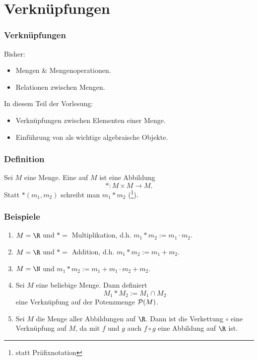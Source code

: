 \section{Verknüpfungen}
%
\begin{frame}\frametitle{Verknüpfungen}
	
	Bisher:
	\begin{itemize}
		\item Mengen \& Mengenoperationen.
		\item Relationen zwischen Mengen.
	\end{itemize}
	
	\vfill
	In diesem Teil der Vorlesung:
	\begin{itemize}
		\item Verknüpfungen zwischen Elementen einer Menge.
		\item Einführung von  als wichtige algebraische Objekte.
	\end{itemize} 
	
\end{frame}
%
%
\begin{frame}\frametitle{Definition}

	Sei $M$ eine Menge. Eine  auf $M$ ist eine Abbildung
	$$
		\ast: M \times M \to M.
	$$
	Statt $\ast(m_1,m_2)$ schreibt man $m_1\ast m_2$ (\footnote{statt Präfixnotation}).
	
\end{frame}
%
%
\begin{frame}\frametitle{Beispiele}

	\begin{enumerate}
		\item $M = \R$ und $\ast=$ Multiplikation, d.h. $m_1\ast m_2 := m_1 \cdot m_2$.
		\pause
		\item $M=\R$ und $\ast=$ Addition, d.h. $m_1\ast m_2 := m_1 + m_2$.
		\pause
		\item $M=\N$ und $m_1\ast m_2 := m_1 + m_1\cdot m_2 + m_2$.
		\pause
		\item Sei $M$ eine beliebige Menge. Dann definiert 
			$$
				M_1\ast M_2 := M_1\cap M_2
			$$ 
			eine Verknüpfung auf der Potenzmenge ${\cal P}(M)$.
		\pause
		\item Sei $M$ die Menge aller Abbildungen auf $\R$. 
		Dann ist die Verkettung $\circ$ eine Verknüpfung auf $M$, da mit $f$ und $g$ auch $f\circ g$  eine Abbildung auf $\R$ ist.
	\end{enumerate}

\end{frame}
